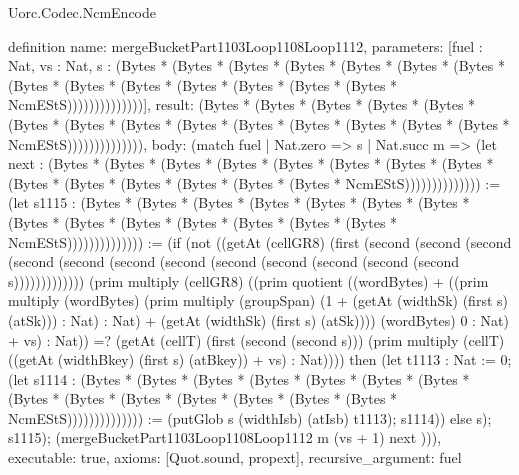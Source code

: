 \begin{lexlean}{Uorc.Codec.NcmEncode}
\begin{semanticmodule}
definition{
  name: mergeBucketPart1103Loop1108Loop1112,
  parameters: [fuel : Nat, vs : Nat, s : (Bytes * (Bytes * (Bytes * (Bytes * (Bytes * (Bytes * (Bytes * (Bytes * (Bytes * (Bytes * (Bytes * (Bytes * (Bytes * (Bytes * NcmEStS))))))))))))))],
  result: (Bytes * (Bytes * (Bytes * (Bytes * (Bytes * (Bytes * (Bytes * (Bytes * (Bytes * (Bytes * (Bytes * (Bytes * (Bytes * (Bytes * NcmEStS)))))))))))))),
  body: (match fuel
    | Nat.zero => s
    | Nat.succ m => (let next : (Bytes * (Bytes * (Bytes * (Bytes * (Bytes * (Bytes * (Bytes * (Bytes * (Bytes * (Bytes * (Bytes * (Bytes * (Bytes * (Bytes * NcmEStS)))))))))))))) := (let s1115 : (Bytes * (Bytes * (Bytes * (Bytes * (Bytes * (Bytes * (Bytes * (Bytes * (Bytes * (Bytes * (Bytes * (Bytes * (Bytes * (Bytes * NcmEStS)))))))))))))) := (if (not ((getAt (cellGR8) (first (second (second (second (second (second (second (second (second (second (second (second (second s))))))))))))) (prim multiply (cellGR8) ((prim quotient ((wordBytes) + ((prim multiply (wordBytes) (prim multiply (groupSpan) (1 + (getAt (widthSk) (first s) (atSk))) : Nat) : Nat) + (getAt (widthSk) (first s) (atSk)))) (wordBytes) 0 : Nat) + vs) : Nat)) =? (getAt (cellT) (first (second (second s))) (prim multiply (cellT) ((getAt (widthBkey) (first s) (atBkey)) + vs) : Nat)))) then (let t1113 : Nat := 0; (let s1114 : (Bytes * (Bytes * (Bytes * (Bytes * (Bytes * (Bytes * (Bytes * (Bytes * (Bytes * (Bytes * (Bytes * (Bytes * (Bytes * (Bytes * NcmEStS)))))))))))))) := (putGlob s (widthIsb) (atIsb) t1113); s1114)) else s); s1115); (mergeBucketPart1103Loop1108Loop1112 m (vs + 1) next ))),
  executable: true,
  axioms: [Quot.sound, propext],
  recursive_argument: fuel
}


\end{semanticmodule}
\end{lexlean}
